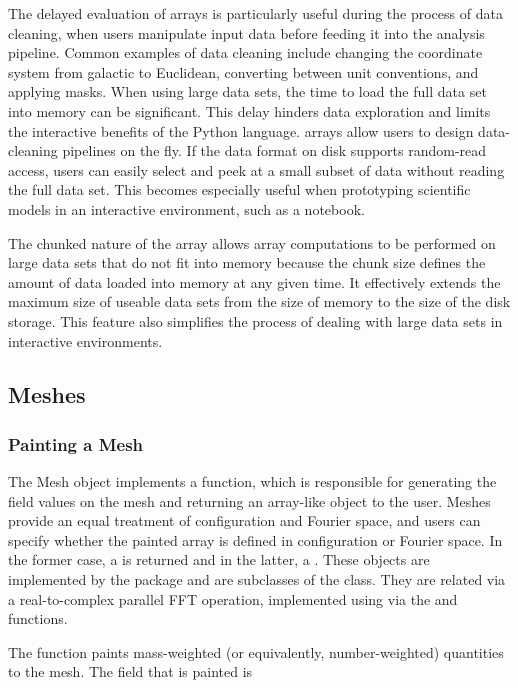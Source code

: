 The delayed evaluation of \dask{} arrays is particularly useful during
the process of data cleaning, when users manipulate input data before
feeding it into the analysis pipeline. Common examples
of data cleaning include changing
the coordinate system from galactic to Euclidean, converting between
unit conventions, and applying masks. When using large data sets,
the time to load the full data set into memory can be significant.
This delay hinders data exploration and limits the interactive benefits
of the Python language. \dask{} arrays
allow users to design data-cleaning pipelines on the fly.
If the data format on disk supports random-read access,
users can easily select and peek at a small subset of data without
reading the full data set. This becomes especially useful when prototyping
scientific models in an interactive environment, such as a \jupyter{} notebook.

The chunked nature of the \dask{} array allows array
computations to be performed on large data sets that do not fit into memory
because the chunk size defines the amount of data loaded into memory at
any given time. It effectively extends the maximum size of
useable data sets from the size of memory to the size of the disk storage.
This feature also simplifies the process of dealing
with large data sets in interactive environments.

\subsection{Meshes}
\label{sec:mesh-details}

\subsubsection{Painting a Mesh}

The Mesh object implements a  function, which is
responsible for generating the field values on the mesh and returning an
array-like object to the user. Meshes provide an equal treatment of
configuration and Fourier space, and users can specify whether the painted
array is defined in configuration or Fourier space.
In the former case, a  is returned and in the latter, a
. These objects are implemented by the \pmesh{}
package and are subclasses of the \numpy{}
 class. They are related via a
real-to-complex parallel FFT operation, implemented using \pfftpython{} via
the  and  functions.

The  function paints mass-weighted (or equivalently,
number-weighted) quantities to the mesh. The field that is painted is

